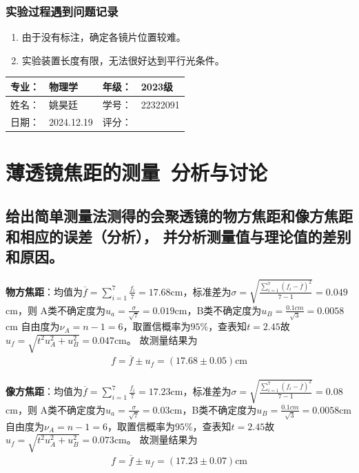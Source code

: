 \documentclass[dvipsnames, svgnames,a4paper,11pt]{article}
\begin{document}
\subsubsection{实验过程遇到问题记录}
\begin{enumerate}
	\item 由于没有标注，确定各镜片位置较难。
	\item 实验装置长度有限，无法很好达到平行光条件。
\end{enumerate}

\clearpage
{}
\begin{table}
	\renewcommand\arraystretch{1.7}
	\begin{tabularx}{\textwidth}{|X|X|X|X|}
	\hline
	专业：& 物理学 &年级：& 2023级\\
	\hline
	姓名： &姚昊廷& 学号：&22322091 \\
	\hline
    日期：&2024.12.19 & 评分： &\\
	\hline
	\end{tabularx}
\end{table}

\section{薄透镜焦距的测量\ \textbf{分析与讨论}}
\subsection{给出简单测量法测得的会聚透镜的物方焦距和像方焦距和相应的误差（分析）， 并分析测量值与理论值的差别和原因。}
\textbf{物方焦距}：均值为$\overline{f}=\sum_{i=1}^{7}\frac{f_i}{7}=17.68$cm，标准差为$\sigma=\sqrt{\frac{\sum_{i=1}^{7}(f_i-\overline{f})^2}{7-1}}=0.049$cm，则
A类不确定度为$u_a=\frac{\sigma}{\sqrt{7}}=0.019$cm，B类不确定度为$u_B=\frac{0.1cm}{\sqrt{3}}=0.0058$cm
自由度为$\nu_A=n-1=6$，取置信概率为$95\%$，查表知$t=2.45$故$u_f=\sqrt{t^2u_A^2+u_B^2}=0.047$cm。
故测量结果为
\begin{align*}
	f=\overline{f}\pm u_f=(17.68\pm0.05)\text{cm}
\end{align*}\par

\textbf{像方焦距}：均值为$\overline{f}=\sum_{i=1}^{7}\frac{f_i}{7}=17.23$cm，标准差为$\sigma=\sqrt{\frac{\sum_{i=1}^{7}(f_i-\overline{f})^2}{7-1}}=0.08$cm，则
A类不确定度为$u_a=\frac{\sigma}{\sqrt{7}}=0.03$cm，B类不确定度为$u_B=\frac{0.1cm}{\sqrt{3}}=0.0058$cm
自由度为$\nu_A=n-1=6$，取置信概率为$95\%$，查表知$t=2.45$故$u_f=\sqrt{t^2u_A^2+u_B^2}=0.073$cm。
故测量结果为
\begin{align*}
	f=\overline{f}\pm u_f=(17.23\pm0.07)\text{cm}
\end{align*}
\end{document}
